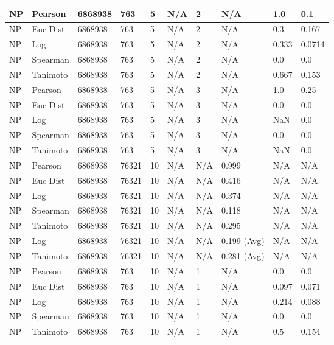 \documentclass{article}
\begin{document}
\begin{longtable}{ |p{1.7cm}|p{1.9cm}|p{1.5cm}|p{1.5cm}|p{0.75cm}|p{0.75cm}|p{0.75cm}|p{0.75cm}|p{1.5cm}|p{1.5cm}|}
    NP & Pearson & 6868938 & 763 & 5 &  N/A & 2 & N/A & 1.0 & 0.1  \\ \hline
    NP & Euc Dist & 6868938 & 763 & 5 & N/A & 2  & N/A &0.3 & 0.167   \\ \hline
    NP & Log & 6868938 & 763 & 5 &  N/A & 2  & N/A & 0.333 & 0.0714  \\ \hline
    NP & Spearman & 6868938 & 763 & 5 & N/A & 2  & N/A &0.0 & 0.0 \\ \hline
    NP & Tanimoto & 6868938 & 763 & 5 & N/A & 2  & N/A & 0.667 & 0.153 \\ \hline
    
    NP & Pearson & 6868938 & 763 & 5 &  N/A & 3 & N/A & 1.0 & 0.25  \\ \hline
    NP & Euc Dist & 6868938 & 763 & 5 & N/A &  3 & N/A &0.0 & 0.0   \\ \hline
    NP & Log & 6868938 & 763 & 5 &  N/A &  3 & N/A & NaN & 0.0  \\ \hline
    NP & Spearman & 6868938 & 763 & 5 & N/A &  3 & N/A &0.0 & 0.0 \\ \hline
    NP & Tanimoto & 6868938 & 763 & 5 & N/A &  3 & N/A & NaN & 0.0 \\ \hline
    
    NP & Pearson & 6868938 & 76321 & 10 &  N/A & N/A & 0.999 & N/A & N/A  \\ \hline
    NP & Euc Dist & 6868938 & 76321 & 10 & N/A & N/A & 0.416 & N/A & N/A   \\ \hline
    NP & Log & 6868938 & 76321 & 10 &  N/A & N/A & 0.374 & N/A & N/A  \\ \hline
    NP & Spearman & 6868938 & 76321 & 10 & N/A & N/A & 0.118 & N/A & N/A \\ \hline
    NP & Tanimoto & 6868938 & 76321 & 10 & N/A & N/A & 0.295 & N/A & N/A \\ \hline
    NP & Log & 6868938 & 76321 & 10 & N/A & N/A & 0.199 (Avg) & N/A & N/A \\ \hline
    NP & Tanimoto & 6868938 & 76321 & 10 & N/A & N/A & 0.281 (Avg) & N/A & N/A \\ \hline
    
    NP & Pearson & 6868938 & 763 & 10 &  N/A & 1 & N/A & 0.0 & 0.0  \\ \hline
    NP & Euc Dist & 6868938 & 763 & 10 & N/A & 1 & N/A &0.097 & 0.071   \\ \hline
    NP & Log & 6868938 & 763 & 10 &  N/A & 1 & N/A & 0.214 & 0.088  \\ \hline
    NP & Spearman & 6868938 & 763 & 10 & N/A & 1 & N/A &0.0 & 0.0 \\ \hline
    NP & Tanimoto & 6868938 & 763 & 10 & N/A & 1 & N/A & 0.5 & 0.154 \\ \hline
    

\end{longtable}
\end{document}
